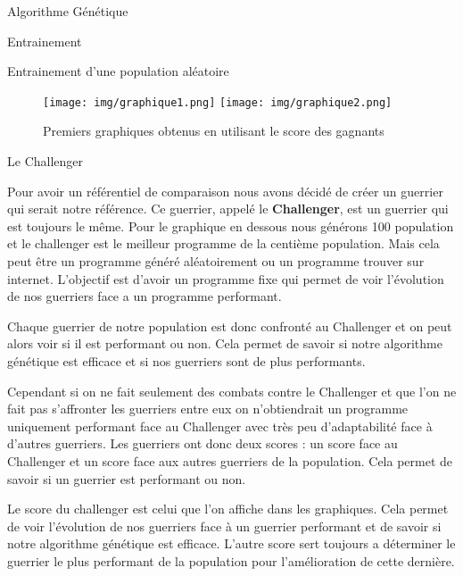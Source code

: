 \documentclass[a4paper, 10pt]{article}
\begin{document}
\begin{section}{Algorithme Génétique}
\begin{subsection}{Entrainement}
\begin{subsubsection}{Entrainement d'une population aléatoire}
                    \begin{figure}[h]
                        \texttt{[image: img/graphique1.png]}
                        \texttt{[image: img/graphique2.png]}
                        \centering
                        \label{fig:graphique1_2}
                        \caption{Premiers graphiques obtenus en utilisant le score des gagnants}
                    \end{figure}
                    \bigskip
                \end{subsubsection}    

                \begin{subsubsection}{Le Challenger}
                    \par
                        Pour avoir un référentiel de comparaison nous avons décidé de créer un guerrier qui serait notre référence. Ce guerrier, appelé le \textbf{Challenger}, est un guerrier qui est toujours le même. Pour le graphique en dessous nous générons 100 population et le challenger est le meilleur programme de la centième population. Mais cela peut être un programme généré aléatoirement ou un programme trouver sur internet. L'objectif est d'avoir un programme fixe qui permet de voir l'évolution de nos guerriers face a un programme performant.
                        \medskip
                    \par
                        Chaque guerrier de notre population est donc confronté au Challenger et on peut alors voir si il est performant ou non. Cela permet de savoir si notre algorithme génétique est efficace et si nos guerriers sont de plus performants.
                        \medskip
                    \par
                        Cependant si on ne fait seulement des combats contre le Challenger et que l'on ne fait pas s'affronter les guerriers entre eux on n'obtiendrait un programme uniquement performant face au Challenger avec très peu d'adaptabilité face à d'autres guerriers. Les guerriers ont donc deux scores : un score face au Challenger et un score face aux autres guerriers de la population. Cela permet de savoir si un guerrier est performant ou non.
                        \medskip
                    \par
                        Le score du challenger est celui que l'on affiche dans les graphiques. Cela permet de voir l'évolution de nos guerriers face à un guerrier performant et de savoir si notre algorithme génétique est efficace. L'autre score sert toujours a déterminer le guerrier le plus performant de la population pour l'amélioration de cette dernière.

\end{subsubsection}
\end{subsection}
\end{section}
\end{document}
